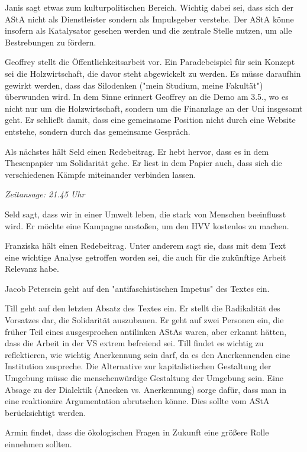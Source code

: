 \documentclass[ngerman,headheight=70pt]{scrartcl}
\begin{document}
    Janis sagt etwas zum kulturpolitischen Bereich. Wichtig dabei sei, dass sich
    der AStA nicht als Dienstleister sondern als Impulsgeber verstehe.
    Der AStA könne insofern als Katalysator gesehen werden und die zentrale
    Stelle nutzen, um alle Bestrebungen zu fördern.

    Geoffrey stellt die Öffentlichkeitsarbeit vor. Ein Paradebeispiel für sein
    Konzept sei die Holzwirtschaft, die davor steht abgewickelt zu werden. Es
    müsse daraufhin gewirkt werden, dass das Silodenken ("mein Studium, meine Fakultät")
    überwunden wird. In dem Sinne erinnert Geoffrey an die Demo am 3.5., wo es
    nicht nur um die Holzwirtschaft, sondern um die Finanzlage an der Uni insgesamt
    geht. Er schließt damit, dass eine gemeinsame Position nicht durch eine
    Website entstehe, sondern durch das gemeinsame Gespräch.

    Als nächstes hält Seld einen Redebeitrag. Er hebt hervor, dass es in dem
    Thesenpapier um Solidarität gehe. Er liest in dem Papier auch, dass sich die
    verschiedenen Kämpfe miteinander verbinden lassen.

    \textit{Zeitansage: 21.45 Uhr}

    Seld sagt, dass wir in einer Umwelt leben, die stark von Menschen beeinflusst
    wird. Er möchte eine Kampagne anstoßen, um den HVV kostenlos zu machen.

    Franziska hält einen Redebeitrag. Unter anderem sagt sie, dass mit dem Text
    eine wichtige Analyse getroffen worden sei, die auch für die zukünftige
    Arbeit Relevanz habe.

    Jacob Petersein geht auf den "antifaschistischen Impetus" des Textes
    ein.

    Till geht auf den letzten Absatz des Textes ein. Er stellt die Radikalität
    des Vorsatzes dar, die Solidarität auszubauen. Er geht auf zwei Personen
    ein, die früher Teil eines ausgesprochen antilinken AStAs waren, aber erkannt
    hätten, dass die Arbeit in der VS extrem befreiend sei. Till findet es wichtig
    zu reflektieren, wie wichtig Anerkennung sein darf, da es den Anerkennenden
    eine Institution zuspreche. Die Alternative zur kapitalistischen Gestaltung
    der Umgebung müsse die menschenwürdige Gestaltung der Umgebung sein. Eine
    Absage zu der Dialektik (Anecken vs. Anerkennung) sorge dafür, dass
    man in eine reaktionäre Argumentation abrutschen könne. Dies sollte vom
    AStA berücksichtigt werden.

    Armin findet, dass die ökologischen Fragen in Zukunft eine größere Rolle
    einnehmen sollten.
\end{document}
